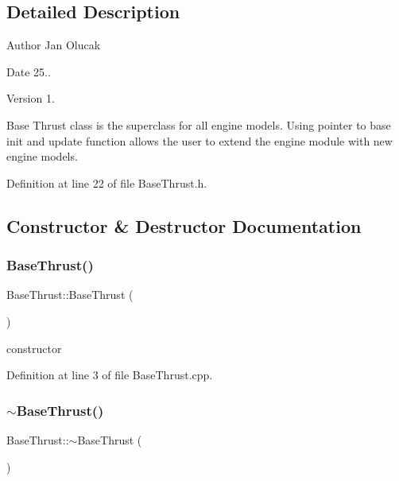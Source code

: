 \subsection{Detailed Description}
\begin{DoxyAuthor}{Author}
Jan Olucak 
\end{DoxyAuthor}
\begin{DoxyDate}{Date}
25.. 
\end{DoxyDate}
\begin{DoxyVersion}{Version}
1.
\end{DoxyVersion}
Base Thrust class is the superclass for all engine models. Using pointer to base init and update function allows the user to extend the engine module with new engine models. 

Definition at line 22 of file Base\+Thrust.\+h.



\subsection{Constructor \& Destructor Documentation}
\mbox{\label{class_base_thrust_a19885a6a70bfc4c02e2d8f310af9f22e}} 
\subsubsection{\texorpdfstring{Base\+Thrust()}{BaseThrust()}}
{\footnotesize\ttfamily Base\+Thrust\+::\+Base\+Thrust (\begin{DoxyParamCaption}{ }\end{DoxyParamCaption})}



constructor 



Definition at line 3 of file Base\+Thrust.\+cpp.

\mbox{\label{class_base_thrust_a554955351c2acfe7a46c00fe056c5c6c}} 
\subsubsection{\texorpdfstring{$\sim$\+Base\+Thrust()}{~BaseThrust()}}
{\footnotesize\ttfamily Base\+Thrust\+::$\sim$\+Base\+Thrust (\begin{DoxyParamCaption}{ }\end{DoxyParamCaption})}



